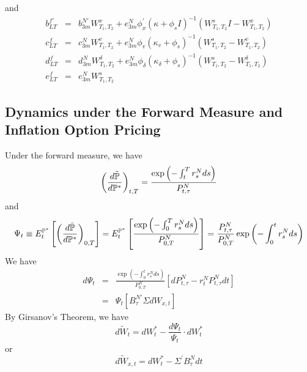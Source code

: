 \documentclass{article}
\begin{document}
and%
\begin{eqnarray*}
b_{LT}^{f\prime } &=&b_{3m}^{N\prime }W_{T_{1},T_{2}}^{x}+e_{3m}^{N}\phi
_{x}^{\prime }\left( \kappa +\phi _{s}I\right) ^{-1}\left(
W_{T_{1},T_{2}}^{s}I-W_{T_{1},T_{2}}^{x}\right) \\
c_{LT}^{f} &=&c_{3m}^{N}W_{T_{1},T_{2}}^{v}+e_{3m}^{N}\phi _{v}\left( \kappa
_{v}+\phi _{s}\right) ^{-1}\left(
W_{T_{1},T_{2}}^{s}-W_{T_{1},T_{2}}^{v}\right) \\
d_{LT}^{f} &=&d_{3m}^{N}W_{T_{1},T_{2}}^{\delta }+e_{3m}^{N}\phi _{\delta
}\left( \kappa _{\delta }+\phi _{s}\right) ^{-1}\left(
W_{T_{1},T_{2}}^{s}-W_{T_{1},T_{2}}^{\delta }\right) \\
e_{LT}^{f} &=&e_{3m}^{N}W_{T_{1},T_{2}}^{s}
\end{eqnarray*}

\subsection{Dynamics under the Forward Measure and Inflation Option Pricing}

Under the forward measure, we have%
\begin{equation*}
\left( \frac{d\mathbb{\tilde{P}}}{d\mathbb{P}^{\ast }}\right) _{t,T}=\frac{%
\exp \left( -\int_{t}^{T}r_{s}^{N}ds\right) }{P_{t,\tau }^{N}}
\end{equation*}%
and%
\begin{equation*}
\Psi _{t}\equiv E_{t}^{\mathbb{P}^{\ast }}\left[ \left( \frac{d\mathbb{%
\tilde{P}}}{d\mathbb{P}^{\ast }}\right) _{0,T}\right] =E_{t}^{\mathbb{P}%
^{\ast }}\left[ \frac{\exp \left( -\int_{0}^{T}r_{s}^{N}ds\right) }{%
P_{0,T}^{N}}\right] =\frac{P_{t,\tau }^{N}}{P_{0,T}^{N}}\exp \left(
-\int_{0}^{t}r_{s}^{N}ds\right)
\end{equation*}%
We have%
\begin{eqnarray*}
d\Psi _{t} &=&\frac{\exp \left( -\int_{0}^{t}r_{s}^{N}ds\right) }{P_{0,T}^{N}%
}\left[ dP_{t,\tau }^{N}-r_{t}^{N}P_{t,\tau }^{N}dt\right] \\
&=&\Psi _{t}\left[ B_{\tau }^{N\prime }\Sigma dW_{x,t}\right]
\end{eqnarray*}%
By Girsanov's Theorem, we have%
\begin{equation*}
d\tilde{W}_{t}=dW_{t}^{\ast }-\frac{d\Psi _{t}}{\Psi _{t}}\cdot dW_{t}^{\ast
}
\end{equation*}%
or%
\begin{equation*}
d\tilde{W}_{x,t}=dW_{t}^{\ast }-\Sigma ^{\prime }B_{\tau }^{N}dt
\end{equation*}
\end{document}
